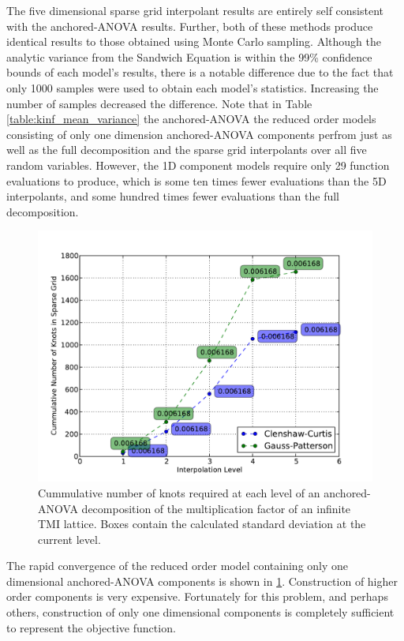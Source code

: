 The five dimensional sparse grid interpolant results are entirely self consistent with the anchored-\ac{ANOVA} results. Further, both of these methods produce identical results to those obtained using Monte Carlo sampling. Although the analytic variance from the Sandwich Equation is within the 99\% confidence bounds of each model's results, there is a notable difference due to the fact that only 1000 samples were used to obtain each model's statistics. Increasing the number of samples decreased the difference. Note that in Table \ref{table:kinf_mean_variance} the anchored-\ac{ANOVA} the reduced order models consisting of only one dimension anchored-\ac{ANOVA} components perfrom just as well as the full decomposition and the sparse grid interpolants over all five random variables. However, the 1D component models require only 29 function evaluations to produce, which is some ten times fewer evaluations than the 5D interpolants, and some hundred times fewer evaluations than the full decomposition. 
\begin{figure}
\caption{ \label{fig:kinf_numknots}
Cummulative number of knots required at each level of an anchored-\ac{ANOVA} decomposition of the multiplication factor of an infinite TMI lattice. Boxes contain the calculated standard deviation at the current level.}
 \begin{center}
  \includegraphics[scale=.75]{./Chapter3/kinf_sparse_grid_numknots.pdf}
 \end{center}
\end{figure}
The rapid convergence of the reduced order model containing only one dimensional anchored-\ac{ANOVA} components is shown in \ref{fig:kinf_numknots}. Construction of higher order components is very expensive. Fortunately for this problem, and perhaps others, construction of only one dimensional components is completely sufficient to represent the objective function. 

